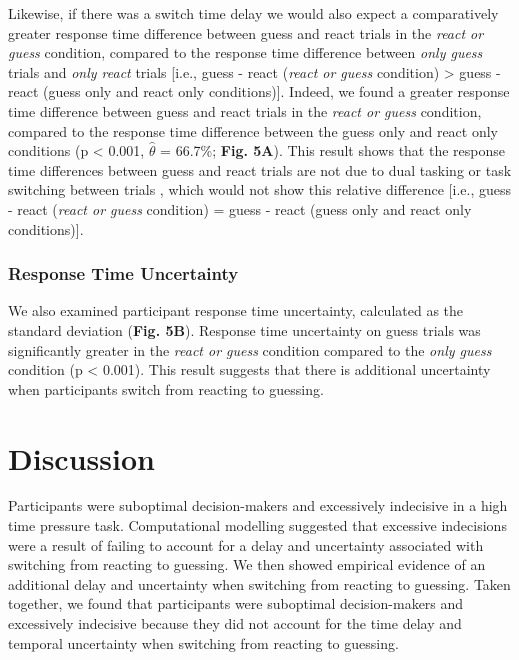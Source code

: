 \documentclass[man,donotrepeattitle,floatsintext,letterpaper,12pt]{apa7}
\newcommand\boldblue[1]{\textcolor{mydarkblue}{\textbf{#1}}}
\begin{document}
\vspace*{-4mm}
Likewise, if there was a switch time delay we would also expect a comparatively greater response time difference between guess and react trials in the \emph{react or guess} condition, compared to the response time difference between \emph{only guess} trials and \emph{only react} trials [i.e., guess - react (\emph{react or guess} condition) > guess - react (guess only and react only conditions)]. Indeed, we found a greater response time difference between guess and react trials in the \emph{react or guess} condition, compared to the response time difference between the guess only and react only conditions (p < 0.001, $\hat{\theta}$ = 66.7\%; \boldblue{Fig. 5A}). This result shows that the response time differences between guess and react trials are not due to dual tasking \autocite{vanselstDecisionResponseDualTask1997} or task switching between trials \autocite{monsellTaskSwitching2003,kieselControlInterferenceTask2010a,rubinsteinExecutiveControlCognitive2001}, which would not show this relative difference  [i.e., guess - react (\emph{react or guess} condition) = guess - react (guess only and react only conditions)].

\subsubsection{Response Time Uncertainty}

\noindent We also examined participant response time uncertainty, calculated as the standard deviation (\boldblue{Fig. 5B}). Response time uncertainty on guess trials was significantly greater in the \emph{react or guess} condition compared to the \emph{only guess} condition (p < 0.001). This result suggests that there is additional uncertainty when participants switch from reacting to guessing.

\section{Discussion}

\noindent Participants were suboptimal decision-makers and excessively indecisive in a high time pressure task. Computational modelling suggested that excessive indecisions were a result of failing to account for a delay and uncertainty associated with switching from reacting to guessing. We then showed empirical evidence of an additional delay and uncertainty when switching from reacting to guessing. Taken together, we found that participants were suboptimal decision-makers and excessively indecisive because they did not account for the time delay and temporal uncertainty when switching from reacting to guessing.
\end{document}
